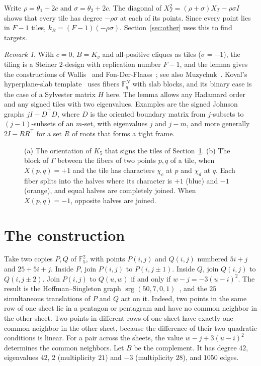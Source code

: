 \documentclass[11pt]{amsart}
\theoremstyle{remark}
\newtheorem{remark}[theorem]{Remark}
\newcommand{\F}{\mathbb{F}}
\DeclareMathOperator{\srg}{srg}
\begin{document}
Write $\rho=\theta_1+2c$ and $\sigma=\theta_2+2c$. The diagonal of $X_T^2=(\rho+\sigma)X_T-\rho\sigma I$ shows that every tile has degree $-\rho\sigma$ at each of its points. Since every point lies in $F-1$ tiles, $k_B=(F-1)(-\rho\sigma)$. Section~\ref{sec:other} uses this to find targets.

\begin{remark}
With $c=0$, $B=K_v$ and all-positive cliques as tiles ($\sigma=-1$), the tiling is a Steiner $2$-design with replication number $F-1$, and the lemma gives the constructions of Wallis~\cite{Wal71} and Fon-Der-Flaass~\cite{FDF02}; see also Muzychuk~\cite{Muz07}. Kova\v{l}'s hyperplane-slab template~\cite{Kov26} uses fibers $\F_q^N$ with slab blocks, and its binary case is the case of a Sylvester matrix $H$ here. The lemma allows any Hadamard order and any signed tiles with two eigenvalues. Examples are the signed Johnson graphs $jI-D^{\top}D$, where $D$ is the oriented boundary matrix from $j$-subsets to $(j-1)$-subsets of an $m$-set, with eigenvalues $j$ and $j-m$, and more generally $2I-RR^{\top}$ for a set $R$ of roots that forms a tight frame.
\end{remark}

\begin{figure}[t]
\centering

\caption{(a) The orientation of $K_5$ that signs the tiles of Section~\ref{sec:construction}. (b) The block of $\Gamma$ between the fibers of two points $p,q$ of a tile, when $X(p,q)=+1$ and the tile has characters $\chi_c$ at $p$ and $\chi_d$ at $q$. Each fiber splits into the halves where its character is $+1$ (blue) and $-1$ (orange), and equal halves are completely joined. When $X(p,q)=-1$, opposite halves are joined.}
\label{fig:lift}
\end{figure}

\section{The construction}\label{sec:construction}

Take two copies $P,Q$ of $\F_5^2$, with points $P(i,j)$ and $Q(i,j)$ numbered $5i+j$ and $25+5i+j$. Inside $P$, join $P(i,j)$ to $P(i,j\pm1)$. Inside $Q$, join $Q(i,j)$ to $Q(i,j\pm2)$. Join $P(i,j)$ to $Q(u,w)$ if and only if $w-j=-3(u-i)^2$. The result is the Hoffman--Singleton graph $\srg(50,7,0,1)$~\cite{HS60}, and the $25$ simultaneous translations of $P$ and $Q$ act on it. Indeed, two points in the same row of one sheet lie in a pentagon or pentagram and have no common neighbor in the other sheet. Two points in different rows of one sheet have exactly one common neighbor in the other sheet, because the difference of their two quadratic conditions is linear. For a pair across the sheets, the value $w-j+3(u-i)^2$ determines the common neighbors. Let $B$ be the complement. It has degree $42$, eigenvalues $42$, $2$ (multiplicity $21$) and $-3$ (multiplicity $28$), and $1050$ edges.
\end{document}
